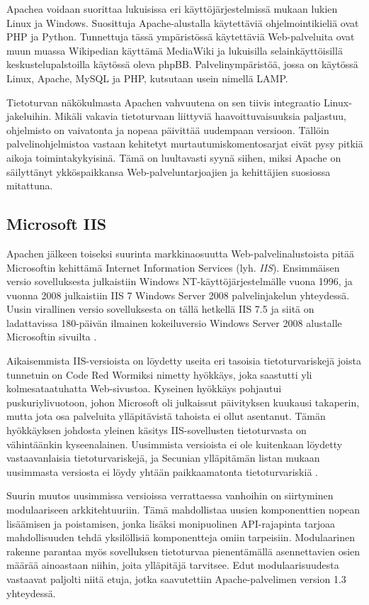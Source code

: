 Apachea voidaan suorittaa lukuisissa eri käyttöjärjestelmissä
mukaan lukien Linux ja Windows. Suosittuja Apache-alustalla käytettäviä
ohjelmointikieliä ovat PHP ja Python. Tunnettuja tässä ympäristössä
käytettäviä Web-palveluita ovat muun muassa Wikipedian käyttämä MediaWiki ja
lukuisilla selainkäyttöisillä keskustelupalstoilla käytössä oleva
phpBB. Palvelinympäristöä, jossa on käytössä Linux, Apache, MySQL ja
PHP, kutsutaan usein nimellä LAMP.

Tietoturvan näkökulmasta Apachen vahvuutena on sen tiivis integraatio
Linux-jakeluihin. Mikäli vakavia tietoturvaan liittyviä
haavoittuvaisuuksia paljastuu, ohjelmisto on vaivatonta ja nopeaa
päivittää uudempaan versioon. Tällöin palvelinohjelmistoa vastaan
kehitetyt murtautumiskomentosarjat eivät pysy pitkiä aikoja
toimintakykyisinä.  Tämä on luultavasti syynä siihen, miksi Apache on
säilyttänyt ykköspaikkansa Web-palveluntarjoajien ja kehittäjien
suosiossa mitattuna.

\subsection{Microsoft IIS}

Apachen jälkeen toiseksi suurinta markkinaosuutta Web-palvelinalustoista pitää Microsoftin kehittämä Internet Information Services (lyh. \textit{IIS}). Ensimmäisen versio sovelluksesta
julkaistiin Windows NT-käyttöjärjestelmälle vuona 1996, ja vuonna 2008 julkaistiin IIS 7 Windows Server 2008 palvelinjakelun yhteydessä. Uusin virallinen versio sovelluksesta on tällä hetkellä   
IIS 7.5 ja siitä on ladattavissa 180-päivän ilmainen kokeiluversio Windows Server 2008 alustalle Microsoftin sivuilta \cite{IIS}.

Aikaisemmista IIS-versioista on löydetty useita eri tasoisia tietoturvariskejä joista tunnetuin on Code Red Wormiksi nimetty hyökkäys, joka saastutti yli kolmesataatuhatta Web-sivustoa.
Kyseinen hyökkäys pohjautui puskuriylivuotoon, johon Microsoft oli julkaissut päivityksen kuukausi takaperin, mutta jota osa palveluita ylläpitävistä tahoista ei ollut asentanut. Tämän hyökkäyksen
johdosta yleinen käsitys IIS-sovellusten tietoturvasta on vähintäänkin kyseenalainen. Uusimmista versioista ei ole kuitenkaan löydetty vastaavanlaisia tietoturvariskejä, ja Secunian
ylläpitämän listan mukaan uusimmasta versiosta ei löydy yhtään paikkaamatonta tietoturvariskiä \cite{Secunia}.

Suurin muutos uusimmissa versioissa verrattaessa vanhoihin on
siirtyminen modulaariseen arkkitehtuuriin. Tämä mahdollistaa uusien komponenttien nopean lisäämisen ja poistamisen, jonka lisäksi  
monipuolinen API-rajapinta tarjoaa mahdollisuuden tehdä yksilöllisiä komponentteja omiin tarpeisiin. Modulaarinen rakenne parantaa myös sovelluksen tietoturvaa pienentämällä asennettavien 
osien määrää ainoastaan niihin, joita ylläpitäjä tarvitsee. Edut modulaarisuudesta
vastaavat paljolti niitä etuja, jotka saavutettiin Apache-palvelimen version
1.3 yhteydessä.

